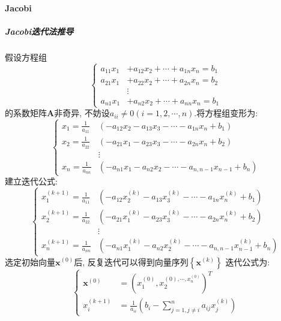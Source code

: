 \documentclass{article}
\begin{document}
\begin{CJK*}{UTF8}{song}
			\paragraph{Jacobi}
				\subparagraph{Jacobi迭代法推导}
				假设方程组
				$$\left\{
					\begin{aligned}
						a_{11}x_1 &+ a_{12}x_2 + \cdots + a_{1n}x_n = b_1 \\ 
						a_{21}x_1 &+ a_{22}x_2 + \cdots + a_{2n}x_n = b_2 \\ 
						&\vdots \\
						a_{n1}x_1 &+ a_{n2}x_2 + \cdots + a_{nn}x_n = b_1 
					\end{aligned}
				\right.$$
				的系数矩阵$\mathbf{A}$非奇异, 不妨设$a_{ii} \neq 0\left(i=1,2,\cdots,n\right)$.将方程组变形为:
				$$\left\{
					\begin{aligned}
						x_1 = \frac{1}{a_{11}}&\left(-a_{12}x_2 -a_{13}x_3 -\cdots - a_{1n}x_n +b_1\right) \\
						x_2 = \frac{1}{a_{22}}&\left(-a_{21}x_1 -a_{23}x_3 -\cdots - a_{2n}x_n +b_2\right) \\
						&\vdots \\
						x_n = \frac{1}{a_{nn}}&\left(-a_{n1}x_1 -a_{n2}x_2 -\cdots - a_{n,n-1}x_{n-1} +b_n\right) 
					\end{aligned}
				\right.$$
				建立迭代公式:
				$$\left\{
					\begin{aligned}
						x_1^{\left(k+1\right)} = \frac{1}{a_{11}}&\left(-a_{12}x_2^{\left(k\right)} -a_{13}x_3^{\left(k\right)} -\cdots - a_{1n}x_n^{\left(k\right)} +b_1\right) \\
						x_2^{\left(k+1\right)} = \frac{1}{a_{22}}&\left(-a_{21}x_1^{\left(k\right)} -a_{23}x_3^{\left(k\right)} -\cdots - a_{2n}x_n^{\left(k\right)} +b_2\right) \\
						&\vdots \\
						x_n^{\left(k+1\right)} = \frac{1}{a_{nn}}&\left(-a_{n1}x_1^{\left(k\right)} -a_{n2}x_2^{\left(k\right)} -\cdots - a_{n,n-1}x_{n-1}^{\left(k\right)} +b_n\right) 
					\end{aligned}
				\right.$$
				选定初始向量$\mathbf{x}^{\left(0\right)}$后, 反复迭代可以得到向量序列$\left\{\mathbf{x}^{\left(k\right)} \right\}$
				迭代公式为:
				$$\left\{
					\begin{aligned}
						\mathbf{x}^{\left(0\right)} &= \left(x_1^{\left(0\right)},x_2^{\left(0\right),\cdots,x_n^{\left(0\right)}}\right)^T \\
						x_i^{\left(k+1\right)} &= \frac{1}{a_{ii}}\left(b_i - \sum_{j=1,j\neq i}^{n}a_{ij}x_j^{\left(k\right)} \right)
					\end{aligned}
				\right.$$
				

\end{CJK*}
\end{document}
